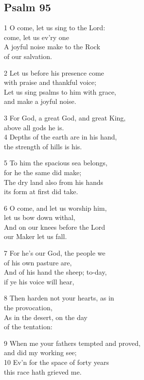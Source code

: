\begin{center}
\quad{}\quad{}
\end{center}

\subsection*{Psalm 95}

1 O come, let us sing to the Lord:\\
come, let us ev’ry one\\
A joyful noise make to the Rock\\
of our salvation.

2 Let us before his presence come\\
with praise and thankful voice;\\
Let us sing psalms to him with grace,\\
and make a joyful noise.

3 For God, a great God, and great King,\\
above all gods he is.\\
4 Depths of the earth are in his hand,\\
the strength of hills is his.

5 To him the spacious sea belongs,\\
for he the same did make;\\
The dry land also from his hands\\
its form at first did take.

6 O come, and let us worship him,\\
let us bow down withal,\\
And on our knees before the Lord\\
our Maker let us fall.

7 For he’s our God, the people we\\
of his own pasture are,\\
And of his hand the sheep; to-day,\\
if ye his voice will hear,

8 Then harden not your hearts, as in\\
the provocation,\\
As in the desert, on the day\\
of the tentation:

9 When me your fathers tempted and proved,\\
and did my working see;\\
10 Ev’n for the space of forty years\\
this race hath grieved me.

